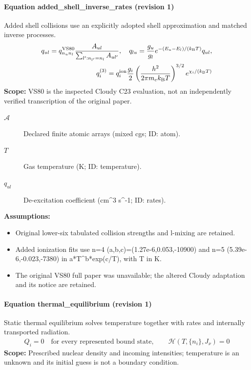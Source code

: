 \paragraph{Equation added\_shell\_inverse\_rates (revision 1)}
Added shell collisions use an explicitly adopted shell approximation and matched inverse processes.
\begin{equation}
\begin{aligned}
q_{u l}=q^{\rm VS80}_{n_u n_l}\frac{A_{u l}}{\sum_{l^\prime:n_{l^\prime}=n_l}A_{u l^\prime}},\quad q_{l u}=\frac{g_u}{g_l}e^{-(E_u-E_l)/(k_{\rm B}T)}q_{u l},\\q_i^{(3)}=q_i^{\rm ion}\frac{g_i}{2}\left(\frac{h^2}{2\pi m_e k_{\rm B}T}\right)^{3/2}e^{\chi_i/(k_{\rm B}T)}
\end{aligned}
\label{eq:escape.coupled_5f_hydrogen:added_5f_shell_5f_inverse_5f_rates:1}
\end{equation}
\noindent\textbf{Scope:} VS80 is the inspected Cloudy C23 evaluation, not an independently verified transcription of the original paper.

\begin{description}
\item[$\mathcal A$] Declared finite atomic arrays (mixed cgs; ID: atom).
\item[$T$] Gas temperature (K; ID: temperature).
\item[$q_{ul}$] De-excitation coefficient (cm\textasciicircum{}3 s\textasciicircum{}-1; ID: rates).
\end{description}

\noindent\textbf{Assumptions:}
\begin{itemize}
\item Original lower-six tabulated collision strengths and l-mixing are retained.
\item Added ionization fits use n=4 (a,b,c)=(1.27e-6,0.053,-10900) and n=5 (5.39e-6,-0.023,-7380) in a*T\textasciicircum{}b*exp(c/T), with T in K.
\item The original VS80 full paper was unavailable; the altered Cloudy adaptation and its notice are retained.
\end{itemize}

\paragraph{Equation thermal\_equilibrium (revision 1)}
Static thermal equilibrium solves temperature together with rates and internally transported radiation.
\begin{equation}
\begin{aligned}
Q_i=0\quad\text{for every represented bound state},\qquad\mathcal H(T,\{n_i\},J_\nu)=0
\end{aligned}
\label{eq:escape.coupled_5f_hydrogen:thermal_5f_equilibrium:1}
\end{equation}
\noindent\textbf{Scope:} Prescribed nuclear density and incoming intensities; temperature is an unknown and its initial guess is not a boundary condition.

